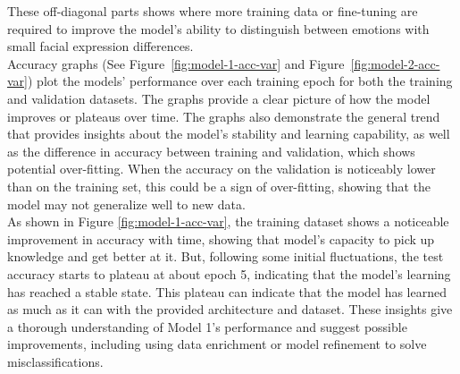 These off-diagonal parts shows where more training data or fine-tuning are required to improve the model's ability to distinguish between emotions with small facial expression differences. 
\\
\indent 
Accuracy graphs (See Figure~\ref{fig:model-1-acc-var} and Figure~\ref{fig:model-2-acc-var}) plot the models' performance over each training epoch for both the training and validation datasets.
The graphs provide a clear picture of how the model improves or plateaus over time. 
The graphs also demonstrate the general trend that provides insights about the model's stability and learning capability, as well as the difference in accuracy between training and validation, which shows potential over-fitting.
When the accuracy on the validation is noticeably lower than on the training set, this could be a sign of over-fitting, showing that the model may not generalize well to new data. 
\\
\indent As shown in Figure \ref{fig:model-1-acc-var}, the training dataset shows a noticeable improvement in accuracy with time, showing that model's capacity to pick up knowledge and get better at it.
But, following some initial fluctuations, the test accuracy starts to plateau at about epoch 5, indicating that the model's learning has reached a stable state.
This plateau can indicate that the model has learned as much as it can with the provided architecture and dataset. 
These insights give a thorough understanding of Model 1's performance and suggest possible improvements, including using data enrichment or model refinement to solve misclassifications.

